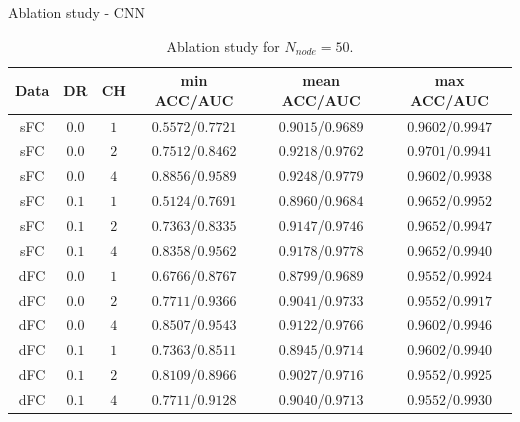 \documentclass{beamer}
\begin{document}
\begin{frame}{Ablation study - CNN}

    \begin{table}[H]
        \centering
        \begin{tabular}{|c|c|c|c|c|c|}
            \hline
            Data & DR    & CH  & min ACC/AUC       & mean ACC/AUC      & max ACC/AUC       \\
            \hline
            sFC  & $0.0$ & $1$ & $0.5572$/$0.7721$ & $0.9015$/$0.9689$ & $0.9602$/$0.9947$ \\
            \hline
            sFC  & $0.0$ & $2$ & $0.7512$/$0.8462$ & $0.9218$/$0.9762$ & $0.9701$/$0.9941$ \\
            \hline
            sFC  & $0.0$ & $4$ & $0.8856$/$0.9589$ & $0.9248$/$0.9779$ & $0.9602$/$0.9938$ \\
            \hline
            sFC  & $0.1$ & $1$ & $0.5124$/$0.7691$ & $0.8960$/$0.9684$ & $0.9652$/$0.9952$ \\
            \hline
            sFC  & $0.1$ & $2$ & $0.7363$/$0.8335$ & $0.9147$/$0.9746$ & $0.9652$/$0.9947$ \\
            \hline
            sFC  & $0.1$ & $4$ & $0.8358$/$0.9562$ & $0.9178$/$0.9778$ & $0.9652$/$0.9940$ \\
            \hline
            dFC  & $0.0$ & $1$ & $0.6766$/$0.8767$ & $0.8799$/$0.9689$ & $0.9552$/$0.9924$ \\
            \hline
            dFC  & $0.0$ & $2$ & $0.7711$/$0.9366$ & $0.9041$/$0.9733$ & $0.9552$/$0.9917$ \\
            \hline
            dFC  & $0.0$ & $4$ & $0.8507$/$0.9543$ & $0.9122$/$0.9766$ & $0.9602$/$0.9946$ \\
            \hline
            dFC  & $0.1$ & $1$ & $0.7363$/$0.8511$ & $0.8945$/$0.9714$ & $0.9602$/$0.9940$ \\
            \hline
            dFC  & $0.1$ & $2$ & $0.8109$/$0.8966$ & $0.9027$/$0.9716$ & $0.9552$/$0.9925$ \\
            \hline
            dFC  & $0.1$ & $4$ & $0.7711$/$0.9128$ & $0.9040$/$0.9713$ & $0.9552$/$0.9930$ \\
            \hline
        \end{tabular}
        \caption{Ablation study for $N_{node} = 50$.}
    \end{table}

\end{frame}
\end{document}

